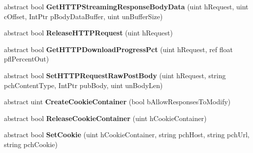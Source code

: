 \begin{DoxyCompactItemize}
\mbox{\label{class_valve_1_1_steamworks_1_1_i_steam_h_t_t_p_afab00e3e6e32350ac2266271fa18ca49}} 
abstract bool {\bfseries Get\+H\+T\+T\+P\+Streaming\+Response\+Body\+Data} (uint h\+Request, uint c\+Offset, Int\+Ptr p\+Body\+Data\+Buffer, uint un\+Buffer\+Size)
\item 
\mbox{\label{class_valve_1_1_steamworks_1_1_i_steam_h_t_t_p_a06a078758d648454c8cc789c199976b9}} 
abstract bool {\bfseries Release\+H\+T\+T\+P\+Request} (uint h\+Request)
\item 
\mbox{\label{class_valve_1_1_steamworks_1_1_i_steam_h_t_t_p_a468e5fcaebdf637f301b398ab617c189}} 
abstract bool {\bfseries Get\+H\+T\+T\+P\+Download\+Progress\+Pct} (uint h\+Request, ref float pfl\+Percent\+Out)
\item 
\mbox{\label{class_valve_1_1_steamworks_1_1_i_steam_h_t_t_p_a8e337468e847388bed731a172f63ef4b}} 
abstract bool {\bfseries Set\+H\+T\+T\+P\+Request\+Raw\+Post\+Body} (uint h\+Request, string pch\+Content\+Type, Int\+Ptr pub\+Body, uint un\+Body\+Len)
\item 
\mbox{\label{class_valve_1_1_steamworks_1_1_i_steam_h_t_t_p_a4dee39a058db0d38f41569591ef1387e}} 
abstract uint {\bfseries Create\+Cookie\+Container} (bool b\+Allow\+Responses\+To\+Modify)
\item 
\mbox{\label{class_valve_1_1_steamworks_1_1_i_steam_h_t_t_p_aae333bc60a83754bb18b5c1d15514ab0}} 
abstract bool {\bfseries Release\+Cookie\+Container} (uint h\+Cookie\+Container)
\item 
\mbox{\label{class_valve_1_1_steamworks_1_1_i_steam_h_t_t_p_aab78173a82cbfd0a989e7457c6d1632c}} 
abstract bool {\bfseries Set\+Cookie} (uint h\+Cookie\+Container, string pch\+Host, string pch\+Url, string pch\+Cookie)
\item 
\mbox{\label{class_valve_1_1_steamworks_1_1_i_steam_h_t_t_p_a6633d485f3eb8d28a04fb114ab3ece6d}} 

\end{DoxyCompactItemize}
